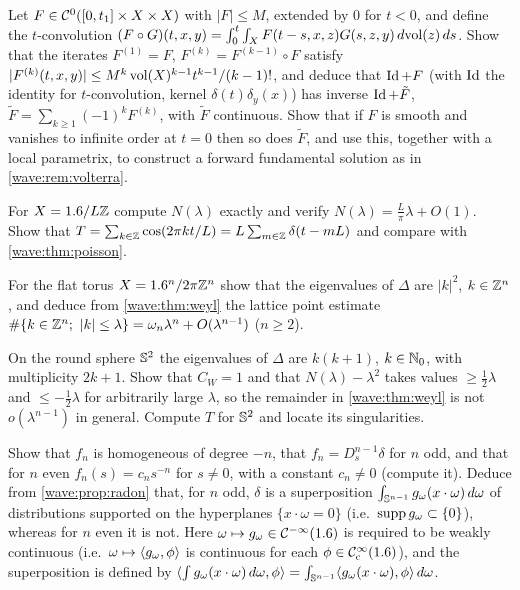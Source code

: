 \begin{exercise}\label{wave:ex:volterra}
Let $F\in\mathcal{C}^0([0,t_1]\times X\times X)$ with $|F|\le M$, extended by $0$ for $t<0$, and define the
$t$-convolution $(F\circ G)(t,x,y)=\int_0^t\int_XF(t-s,x,z)G(s,z,y)\,d\mathrm{vol}(z)\,ds$. Show that the
iterates $F^{(1)}=F$, $F^{(k)}=F^{(k-1)}\circ F$ satisfy
$|F^{(k)}(t,x,y)|\le M^k\operatorname{vol}(X)^{k-1}t^{k-1}/(k-1)!$, and deduce that $\operatorname{Id}+F$ (with $\operatorname{Id}$ the
identity for $t$-convolution, kernel $\delta(t)\delta_y(x)$) has inverse $\operatorname{Id}+\tilde F$,
$\tilde F=\sum_{k\ge1}(-1)^kF^{(k)}$, with $\tilde F$ continuous. Show that if $F$ is smooth and
vanishes to infinite order at $t=0$ then so does $\tilde F$, and use this, together with a local
parametrix, to construct a forward fundamental solution as in \cref{wave:rem:volterra}.
\end{exercise}

\begin{exercise}\label{wave:ex:circle}
For $X=1.6/L\mathbb{Z}$ compute $N(\lambda)$ exactly and verify $N(\lambda)=\frac L\pi\lambda+O(1)$. Show that
$T=\sum_{k\in\mathbb{Z}}\cos(2\pi kt/L)=L\sum_{m\in\mathbb{Z}}\delta(t-mL)$ and compare with
\cref{wave:thm:poisson}.
\end{exercise}

\begin{exercise}\label{wave:ex:torus}
For the flat torus $X=1.6^n/2\pi\mathbb{Z}^n$ show that the eigenvalues of $\Delta$ are $|k|^2$,
$k\in\mathbb{Z}^n$, and deduce from \cref{wave:thm:weyl} the lattice point estimate
$\#\{k\in\Z^n;\ |k|\le\lambda\}=\omega_n\lambda^n+O(\lambda^{n-1})$ ($n\ge2$).
\end{exercise}

\begin{exercise}\label{wave:ex:sphere}
On the round sphere $\mathbb{S}^2$ the eigenvalues of $\Delta$ are $k(k+1)$, $k\in\mathbb{N}_0$, with
multiplicity $2k+1$. Show that $C_W=1$ and that $N(\lambda)-\lambda^2$ takes values $\ge\frac12\lambda$ and
$\le-\frac12\lambda$ for arbitrarily large $\lambda$, so the remainder in \cref{wave:thm:weyl} is not
$o(\lambda^{n-1})$ in general. Compute $T$ for $\mathbb{S}^2$ and locate its singularities.
\end{exercise}

\begin{exercise}\label{wave:ex:fn}
Show that $f_n$ is homogeneous of degree $-n$, that $f_n=D_s^{n-1}\delta$ for $n$ odd, and that
for $n$ even $f_n(s)=c_ns^{-n}$ for $s\ne0$, with a constant $c_n\ne0$ (compute it). Deduce from
\cref{wave:prop:radon} that, for $n$ odd, $\delta$ is a superposition
$\int_{\mathbb{S}^{n-1}}g_\omega(x\cdot\omega)\,d\omega$ of distributions supported on the
hyperplanes $\{x\cdot\omega=0\}$ (i.e.\ $\operatorname{supp} g_\omega\subset\{0\}$), whereas for $n$ even it is not.
Here $\omega\mapsto g_\omega\in\mathcal{C}^{-\infty}(1.6)$ is required to be weakly continuous (i.e.\
$\omega\mapsto\langle g_\omega, \phi\rangle$ is continuous for each $\phi\in\mathcal{C}^\infty_{\mathrm{c}}(1.6)$), and the
superposition is defined by $\langle \int g_\omega(x\cdot\omega)\,d\omega, \phi\rangle=\int_{\mathbb{S}^{n-1}}
\langle g_\omega(x\cdot\omega), \phi\rangle\,d\omega$.
\end{exercise}

